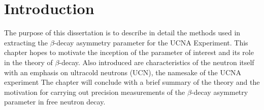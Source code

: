\chapter{Introduction}
\label{ch:Introduction}

The purpose of this dissertation is to describe in detail
the methods used in extracting the $\beta$-decay asymmetry parameter
for the UCNA Experiment. This chapter hopes to motivate the inception
of the parameter of interest and its role in the theory of $\beta$-decay.
Also introduced are characteristics of the neutron itself with an
emphasis on ultracold neutrons (UCN), the namesake of the UCNA experiment
The chapter will conclude with a brief summary of the
theory and the motivation for carrying out precision measurements of the
$\beta$-decay asymmetry parameter in free neutron decay.

